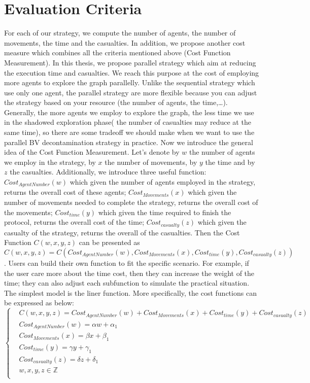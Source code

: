 \section{Evaluation Criteria}
For each of our strategy, we compute the number of agents, the number of movements, the time and the casualties.  In addition, we propose another cost measure which combines all the criteria mentioned above (Cost Function Measurement). In this thesis, we propose parallel strategy which aim at reducing the execution time and casualties. We reach this purpose at the cost of employing more agents to explore the graph parallelly. Unlike the sequential strategy which use only one agent, the parallel strategy are more flexible because you can adjust the strategy based on your resource (the number of agents, the time,\ldots). Generally, the more agents we employ to explore the graph, the less time we use in the shadowed exploration phase( the number of casualties may reduce at the same time), so there are some tradeoff we should make when we want to use the parallel BV decontamination strategy in practice. Now we introduce the general idea of the Cost Function Measurement.
Let's denote by $w$ the number of agents we employ in the strategy, by $x$ the number of movements, by $y$ the time and by $z$ the casualties. Additionally, we introduce three useful function: $Cost_{AgentNumber}(w)$ which given the number of agents employed in the strategy, returns the overall cost of these agents; $Cost_{Movements}(x)$ which given the number of movements needed to complete the strategy, returns the overall cost of the movements; $Cost_{time}(y)$ which given the time required to finish the protocol, returns the overall cost of the time; $Cost_{casualty}(z)$ which given the casualty of the strategy, returns the overall of the casualties. Then the Cost Function $C(w, x, y, z)$ can be presented as $C(w, x, y, z)=C(Cost_{AgentNumber}(w), Cost_{Movements}(x), Cost_{time}(y), Cost_{casualty}(z))$.
Users can build their own function to fit the specific scenario. For example, if the user care more about the time cost, then they can increase the weight of the time; they can also adjust each subfunction to simulate the practical situation. The simplest model is the liner function. More specifically, the cost functions can be expressed as below:\\
\begin{equation}
\left\{
\begin{aligned}
&C(w, x, y, z)=Cost_{AgentNumber}(w)+Cost_{Movements}(x)+Cost_{time}(y)+Cost_{casualty}(z)\\
&Cost_{AgentNumber}(w)=\alpha w+\alpha _1\\
&Cost_{Movements}(x)=\beta x+\beta _1\\
&Cost_{time}(y)=\gamma y+\gamma _1\\
&Cost_{casualty}(z)=\delta z+\delta _1\\
&w, x, y, z\in \mathbb{Z}\\
\end{aligned}
\right.
\end{equation}
